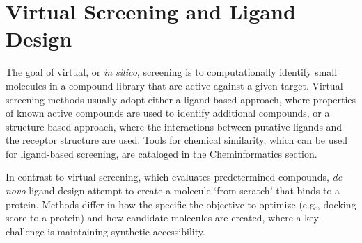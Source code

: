 \section{Virtual Screening and Ligand Design}

The goal of virtual, or \textit{in silico}, screening is to computationally identify small molecules in a compound library that are active against a given target.  Virtual screening methods usually adopt either a ligand-based approach, where properties of known active compounds are used to identify additional compounds, or a structure-based approach, where the interactions between putative ligands and the receptor structure are used.  Tools for chemical similarity, which can be used for ligand-based screening, are cataloged in the Cheminformatics section.

In contrast to virtual screening, which evaluates predetermined compounds, \textit{de novo} ligand design attempt to create a molecule `from scratch' that binds to a protein.  Methods differ in how the specific the objective to optimize (e.g., docking score to a protein) and how candidate molecules are created, where a key challenge is maintaining synthetic accessibility. 